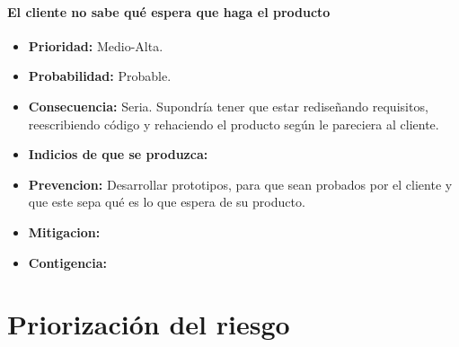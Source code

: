 \documentclass[spanish,a4paper,12pt]{report}	%
\begin{document}
\subsection*{El cliente no sabe qué espera que haga el producto}		

	\begin{itemize}
		\item \textbf {Prioridad: }Medio-Alta.
		\item \textbf {Probabilidad: }Probable.
		\item \textbf {Consecuencia: }Seria. Supondría tener que estar rediseñando requisitos, reescribiendo código y rehaciendo el producto según le pareciera al cliente.
		\item \textbf {Indicios de que se produzca: }
		\item \textbf {Prevencion: }Desarrollar prototipos, para que sean probados por el cliente y que este sepa qué es lo que espera de su producto.
		\item \textbf {Mitigacion: }
		\item \textbf {Contigencia: }
	\end{itemize}


\newpage
\mbox{}
\thispagestyle{empty}						%
\newpage

\part{Priorización del riesgo}


\newpage
\mbox{}
\thispagestyle{empty}						%
\newpage
\end{document}
